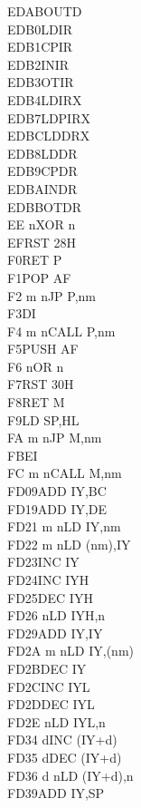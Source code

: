 \documentclass[12pt,twoside,openright,a4paper]{book}
\begin{document}
\begin{multicols}{3}
{\begin{tabbing}
	EDAB\>OUTD\\
	EDB0\>LDIR\\
	EDB1\>CPIR\\
	EDB2\>INIR\\
	EDB3\>OTIR\\
	EDB4\>LDIRX\ZXN\\
	EDB7\>LDPIRX\ZXN\\
	EDBC\>LDDRX\ZXN\\
	EDB8\>LDDR\\
	EDB9\>CPDR\\
	EDBA\>INDR\\
	EDBB\>OTDR\\
	EE n\>XOR n\\
	EF\>RST 28H\\
	F0\>RET P\\
	F1\>POP AF\\
	F2 m n\>JP P,nm\\
	F3\>DI\\
	F4 m n\>CALL P,nm\\
	F5\>PUSH AF\\
	F6 n\>OR n\\
	F7\>RST 30H\\
	F8\>RET M\\
	F9\>LD SP,HL\\
	FA m n\>JP M,nm\\
	FB\>EI\\
	FC m n\>CALL M,nm\\
	FD09\>ADD IY,BC\\
	FD19\>ADD IY,DE\\
	FD21 m n\>LD IY,nm\\
	FD22 m n\>LD (nm),IY\\
	FD23\>INC IY\\
	FD24\>INC IYH\UNDOC\\
	FD25\>DEC IYH\UNDOC\\
	FD26 n\>LD IYH,n\UNDOC\\
	FD29\>ADD IY,IY\\
	FD2A m n\>LD IY,(nm)\\
	FD2B\>DEC IY\\
	FD2C\>INC IYL\UNDOC\\
	FD2D\>DEC IYL\UNDOC\\
	FD2E n\>LD IYL,n\UNDOC\\
	FD34 d\>INC (IY+d)\\
	FD35 d\>DEC (IY+d)\\
	FD36 d n\>LD (IY+d),n\\
	FD39\>ADD IY,SP\\

\end{tabbing}}
\end{multicols}
\end{document}
